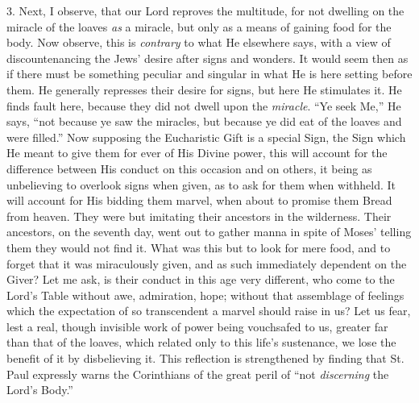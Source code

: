 3. Next, I observe, that our Lord reproves the multitude, for not
dwelling on the miracle of the loaves \emph{as} a miracle, but only as
a means of gaining food for the body. Now observe, this is \emph{contrary}
to what He elsewhere says, with a view of discountenancing the Jews'
desire after signs and wonders. It would seem then as if there must be
something peculiar and singular in what He is here setting before
them. He generally represses their desire for signs, but here He
stimulates it. He finds fault here, because they did not dwell upon
the \emph{miracle}. ``Ye seek Me,'' He says, ``not because
ye saw the miracles, but because ye did eat of the loaves and were
filled.'' Now supposing the Eucharistic Gift is a special Sign,
the Sign which He meant to give them for ever of His Divine power,
this will account for the difference between His conduct on this
occasion and on others, it being as unbelieving to overlook signs when
given, as to ask for them when withheld. It will account for His
bidding them marvel, when about to promise them Bread from heaven.
They were but imitating their ancestors in the wilderness. Their
ancestors, on the seventh day, went out to gather manna in spite of
Moses' telling them they would not find it. What was this but to look
for mere food, and to forget that it was miraculously given, and as
such immediately dependent on the Giver? Let me ask, is their conduct
in this age very different, who come to the Lord's Table without awe,
admiration, hope; without that assemblage of feelings which the
expectation of so transcendent a marvel should raise in us? Let us
fear, lest a real, though invisible work of power being vouchsafed to
us, greater far than that of the loaves, which related only to this
life's sustenance, we lose the benefit of it by disbelieving it. This
reflection is strengthened by finding that St. Paul expressly warns
the Corinthians of the great peril of ``not \emph{discerning} the
Lord's Body.''

